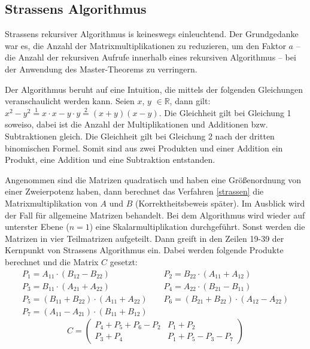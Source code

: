 \subsection{Strassens Algorithmus}
Strassens rekursiver Algorithmus is keineswegs einleuchtend. Der Grundgedanke war es, die Anzahl der Matrixmultiplikationen zu reduzieren, um den Faktor $a$ -- die Anzahl der rekursiven Aufrufe innerhalb eines rekursiven Algorithmus -- bei der Anwendung des Master-Theorems zu verringern. 

Der Algorithmus beruht auf eine Intuition, die mittels der folgenden Gleichungen veranschaulicht werden kann. Seien $x$, $y$ $\in \mathbb{R}$, dann gilt: $x^2 - y^2 \stackrel{1}{=} x \cdot x - y \cdot y \stackrel{2}{=} (x + y)(x - y)$. Die Gleichheit gilt bei Gleichung 1 soweiso, dabei ist die Anzahl der Multiplikationen und Additionen bzw. Subtraktionen gleich. Die Gleichheit gilt bei Gleichung 2 nach der dritten binomischen Formel. Somit sind aus zwei Produkten und einer Addition ein Produkt, eine Addition und eine Subtraktion entstanden. 

Angenommen sind die Matrizen quadratisch und haben eine Größenordnung von einer Zweierpotenz haben, dann berechnet das Verfahren \ref{strassen} die Matrixmultiplikation von $A$ und $B$ (Korrektheitsbeweis später). Im Ausblick wird der Fall für allgemeine Matrizen behandelt. Bei dem Algorithmus wird wieder auf unterster Ebene ($n = 1$) eine Skalarmultiplikation durchgeführt. Sonst werden die Matrizen in vier Teilmatrizen aufgeteilt. Dann greift in den Zeilen 19-39 der Kernpunkt von Strassens Algorithmus ein. Dabei werden folgende Produkte berechnet und die Matrix $C$ gesetzt:
\begin{align*} 
        P_{1} = A_{11} \cdot \left(B_{12} - B_{22}\right) \; \; \; \; & P_{2} = B_{22} \cdot \left(A_{11} + A_{12}\right) \\
        P_{3} = B_{11} \cdot \left(A_{21} + A_{22}\right) \; \; \; \; & P_{4} = A_{22} \cdot \left(B_{21} - B_{11}\right) \\
        P_{5} = \left(B_{11} + B_{22}\right) \cdot \left(A_{11} + A_{22}\right) \; \; \; \; & P_{6} = \left(B_{21} + B_{22}\right) \cdot \left(A_{12} - A_{22}\right) \\
        P_{7} = \left(A_{11} - A_{21}\right) \cdot \left(B_{11} + B_{12}\right) \; \; \; \; &
\end{align*}
\begin{equation}\label{eqstrassem}
    C =\left(\begin{array}{cc}
                P_{4} + P_{5} + P_{6} - P_{2} & P_{1} + P_{2} \\
                P_{3} + P_{4} & P_{1} + P_{5} - P_{3} - P_{7} 
            \end{array}\right)
\end{equation}

